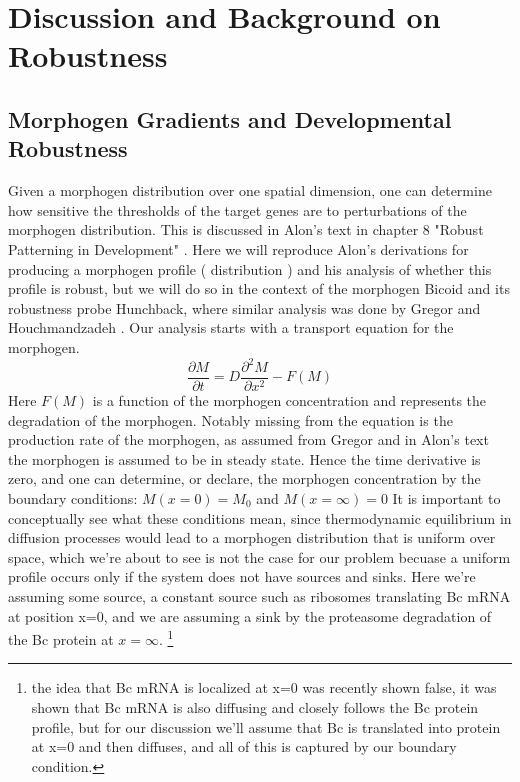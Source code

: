 \section{Discussion and Background on Robustness}
\subsection{Morphogen Gradients and Developmental Robustness}

Given a morphogen distribution over one spatial dimension, one can determine how sensitive the thresholds of the target genes are to perturbations of the morphogen distribution.  This is discussed in Alon's text in chapter 8 "Robust Patterning in Development" \cite{designp}.  Here we will reproduce Alon's derivations for producing a morphogen profile ( distribution ) and his analysis of whether this profile is robust, but we will do so in the context of the morphogen Bicoid and its robustness probe Hunchback, where similar analysis was done by Gregor and Houchmandzadeh \cite{pmid17632062}\cite{pmid11845210}.  Our analysis starts with a transport equation for the morphogen.
\begin{equation}\label{}
    \frac{\partial M}{\partial t} =  D \frac{\partial^2 M }{\partial x^2} - F(M)
\end{equation}
Here $F(M)$ is a function of the morphogen concentration and represents the degradation of the morphogen.  Notably missing from the equation is the production rate of the morphogen, as assumed from Gregor and in Alon's text the morphogen is assumed to be in steady state\cite{designp}.  Hence the time derivative is zero, and one can determine, or declare, the morphogen concentration by the boundary conditions:
$
    M(x = 0) = M_0 $ and $  M(x=\infty) = 0
$
 It is important to conceptually see what these conditions mean, since thermodynamic equilibrium in diffusion processes would lead to a morphogen distribution that is uniform over space, which we're about to see is not the case for our problem becuase a uniform profile occurs only if the system does not have sources and sinks.  Here we're assuming some source, a constant source such as ribosomes translating Bc mRNA at position x=0, and we are assuming a sink by the proteasome degradation of the Bc protein at $x=\infty$. \footnote[1]{ the idea that Bc mRNA is localized at x=0 was recently shown false, it was shown that Bc mRNA is also diffusing and closely follows the Bc protein profile, but for our discussion we'll assume that Bc is translated into protein at x=0 and then diffuses, and all of this is captured by our boundary condition.}
